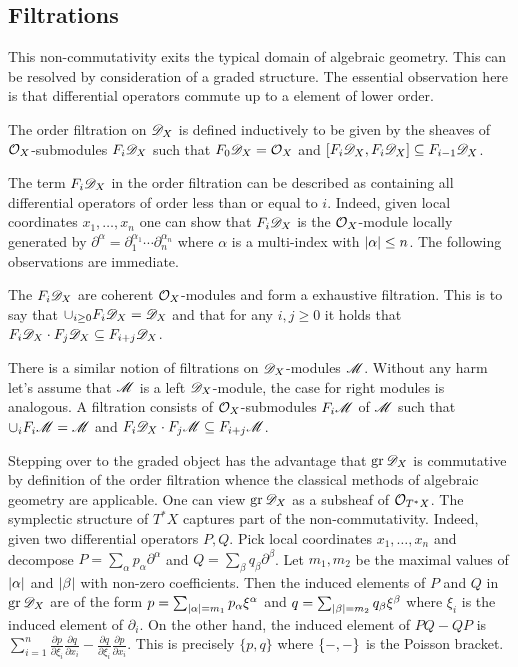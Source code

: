 \subsection{Filtrations}
This non-commutativity exits the typical domain of algebraic geometry.
This can be resolved by consideration of a graded structure.
The essential observation here is that differential operators commute up to a element of lower order.
\begin{definition}
  The order filtration on $\mathscr{D}_X$ is defined inductively to be given by the sheaves of $\mathcal{O}_X$-submodules $F_i \mathscr{D}_X$ such that $F_0\mathscr{D}_X = \mathcal{O}_X$ and $[F_i\mathscr{D}_X, F_i \mathscr{D}_X] \subseteq F_{i-1}\mathscr{D}_X$.
\end{definition}
The term $F_i \mathscr{D}_X$ in the order filtration can be described as containing all differential operators of order less than or equal to $i$.
Indeed, given local coordinates $x_1,\ldots, x_n$ one can show that $F_i\mathscr{D}_X$ is the $\mathcal{O}_X$-module locally generated by $\partial^\alpha = \partial_1^{\alpha_1}\cdots \partial_n^{\alpha_n}$ where $\alpha$ is a multi-index with $\vert \alpha \vert\leq n$.
The following observations are immediate.
\begin{lemma}
  The $F_i\mathscr{D}_X$ are coherent $\mathcal{O}_X$-modules and form a exhaustive filtration. This is to say that $\cup_{i\geq 0}F_i\mathscr{D}_X = \mathscr{D}_X$
  and that for any $i,j\geq 0$ it holds that $F_i\mathscr{D}_X \cdot F_j \mathscr{D}_X \subseteq F_{i+j}\mathscr{D}_X$.
\end{lemma}
There is a similar notion of filtrations on $\mathscr{D}_X$-modules $\mathscr{M}$.
Without any harm let's assume that $\mathscr{M}$ is a left $\mathscr{D}_X$-module, the case for right modules is analogous.
A filtration consists of $\mathcal{O}_X$-submodules $F_i\mathscr{M}$ of $\mathscr{M}$ such that $\cup_i F_i \mathscr{M} = \mathscr{M}$ and $F_i\mathscr{D}_X \cdot F_j\mathscr{M} \subseteq F_{i+j}\mathscr{M}$.

Stepping over to the graded object has the advantage that $\operatorname{gr} \mathscr{D}_X$ is commutative by definition of the order filtration whence the classical methods of algebraic geometry are applicable.
One can view $\operatorname{gr}\mathscr{D}_X$ as a subsheaf of $\mathcal{O}_{T^*X}$.
The symplectic structure of $T^* X$ captures part of the non-commutativity.
Indeed, given two differential operators $P, Q$.
Pick local coordinates $x_1,\ldots, x_n$ and decompose $P = \sum_{\alpha} p_\alpha \partial^\alpha $ and $Q = \sum_{\beta} q_\beta \partial^\beta$.
Let $m_1,m_2$ be the maximal values of $\vert \alpha \vert$ and $\vert \beta \vert$ with non-zero coefficients.
Then the induced elements of $P$ and $Q$ in $\operatorname{gr} \mathscr{D}_X$ are of the form $p = \sum_{\vert \alpha \vert = m_1} p_\alpha \xi^\alpha$ and $q = \sum_{\vert \beta \vert = m_2}q_\beta \xi^\beta $ where $\xi_i$ is the induced element of $\partial_i$.
On the other hand, the induced element of $PQ - QP$ is $\sum_{i=1}^n\frac{\partial p}{\partial \xi_i}\frac{\partial q}{\partial x_i} - \frac{\partial q}{\partial \xi_i}\frac{\partial p}{\partial x_i}$.
This is precisely $\{p,q\}$ where $\{{-},{-}\}$ is the Poisson bracket.

